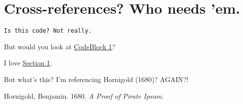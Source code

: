 \hypertarget{me}{%
\section{Cross-references? Who needs 'em.}\label{me}}

\hypertarget{snippet}{%
\label{snippet}}%
\begin{verbatim}
Is this code? Not really.
\end{verbatim}

But would you look at \protect\hyperlink{snippet}{CodeBlock 1}?

I love \protect\hyperlink{me}{Section 1}.

But what's this? I'm referencing Hornigold (1680)? AGAIN?!

\hypertarget{refs}{}
\begin{CSLReferences}{1}{0}
\leavevmode{}%
Hornigold, Benjamin. 1680. \emph{A Proof of Pirate Ipsum}.

\end{CSLReferences}

